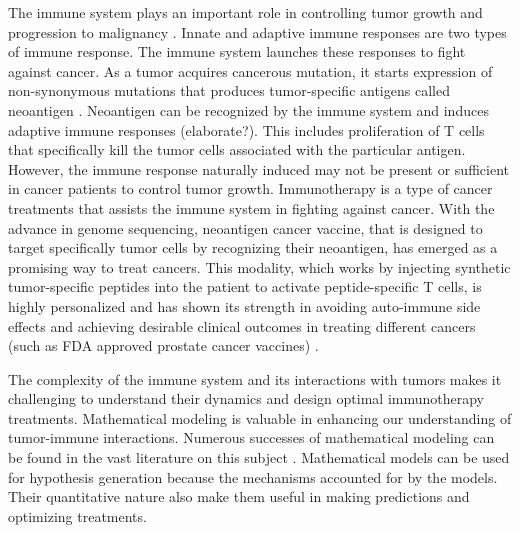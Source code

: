 \documentclass[review,authoryear]{elsarticle}
\begin{document}
The immune system plays an important role in controlling tumor growth
and progression to malignancy \citep{Waldman2020}. Innate and adaptive
immune responses are two types of immune response. The immune system
launches these responses to fight against cancer. As a tumor acquires
cancerous mutation, it starts expression of non-synonymous mutations
that produces tumor-specific antigens called neoantigen \citep{Peng2019}.
Neoantigen can be recognized by the immune system and induces adaptive
immune responses (elaborate?). This includes proliferation of T cells
that specifically kill the tumor cells associated with the particular antigen.
However, the immune response naturally induced may not be present
or sufficient in cancer patients to control tumor growth. Immunotherapy
is a type of cancer treatments that assists the immune system in fighting
against cancer. With the advance in genome sequencing, neoantigen
cancer vaccine, that is designed to target specifically tumor cells
by recognizing their neoantigen, has emerged as a promising way to
treat cancers. This modality, which works by injecting synthetic tumor-specific
peptides into the patient to activate peptide-specific T cells, is
highly personalized and has shown its strength in avoiding auto-immune
side effects \citep{Nelde2021} and achieving desirable clinical outcomes in
treating different cancers (such as FDA approved prostate cancer vaccines)
\citep[e.g.][]{Ott2017,Pan2018,Peng2019}. 

The complexity of the immune system and its interactions with tumors
makes it challenging to understand their dynamics and design optimal
immunotherapy treatments. Mathematical modeling is valuable in enhancing
our understanding of tumor-immune interactions. Numerous successes
of mathematical modeling can be found in the vast literature on this
subject \citep[e.g. see reviews by][and references therein]{Eftimie2016,Mahlbacher2019,Nukala2021}. Mathematical models can be used for hypothesis
generation because the mechanisms accounted for by the models. Their
quantitative nature also make them useful in making predictions and
optimizing treatments. 
\end{document}
